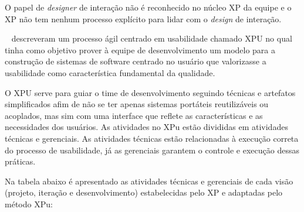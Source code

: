 O papel de \emph{designer} de interação não é reconhecido no núcleo XP da equipe e o XP não tem nenhum processo explícito para lidar com o \emph{design} de interação. 
%

~ descreveram um processo ágil centrado em usabilidade chamado XPU no qual tinha como objetivo prover à equipe de desenvolvimento um modelo para a construção de sistemas de software centrado no usuário que valorizasse a usabilidade como característica fundamental da qualidade. 

O XPU serve para guiar o time de desenvolvimento seguindo técnicas e artefatos simplificados afim de não se ter apenas sistemas portáteis reutilizáveis ou acoplados, mas sim com uma interface que reflete as características e as necessidades dos usuários. 
%
As atividades no XPu estão divididas em atividades técnicas e gerenciais. As atividades técnicas estão relacionadas à execução correta do processo de usabilidade, já as gerenciais garantem o controle e execução dessas práticas.

Na tabela abaixo é apresentado as atividades técnicas e gerenciais de cada visão (projeto, iteração e desenvolvimento) estabelecidas pelo XP e adaptadas pelo método XPu:

